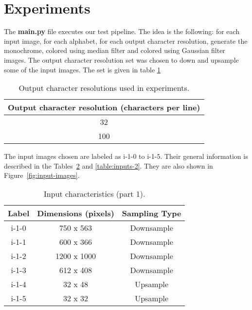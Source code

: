 \documentclass[]{IEEEtran}
\begin{document}

\section{Experiments}
The \textbf{main.py} file executes our test pipeline. The idea is the following: for each input image, for each alphabet, for each output character resolution, generate the monochrome, colored using median filter and colored using Gaussian filter images.
The output character resolution set was chosen to down and upsample some of the input images. The set is given in table \ref{table:resolutions}

\begin{table}[H]
\centering
\begin{center}
\begin{tabular}{ |c| } 
 \hline
 Output character resolution (characters per line)\\
 \hline
 32 \\ 
 \hline
 100  \\
 \hline
\end{tabular}
 \label{table:resolutions}
 \caption{Output character resolutions used in experiments.}
\end{center}
\end{table}

The input images chosen are labeled as i-1-0 to i-1-5. Their general information is described in the Tables~\ref{table:inputs-1} and \ref{table:inputs-2}. They are also shown in Figure~\ref{fig:input-images}.

\begin{table}[H]
\centering
\begin{tabular}{ |c|c|c| } 
 \hline
 Label & Dimensions (pixels) & Sampling Type\\
 \hline
 i-1-0 & 750 x 563 & Downsample\\  
 \hline
 i-1-1 & 600 x 366 & Downsample\\
 \hline
 i-1-2 & 1200 x 1000 & Downsample\\
 \hline
 i-1-3 & 612 x 408 & Downsample\\
 \hline
 i-1-4 & 32 x 48 & Upsample \\
 \hline
 i-1-5 & 32 x 32 & Upsample\\
 \hline
\end{tabular}
 \label{table:inputs-1}
 \caption{Input characteristics (part 1).}
\end{table}
\end{document}

